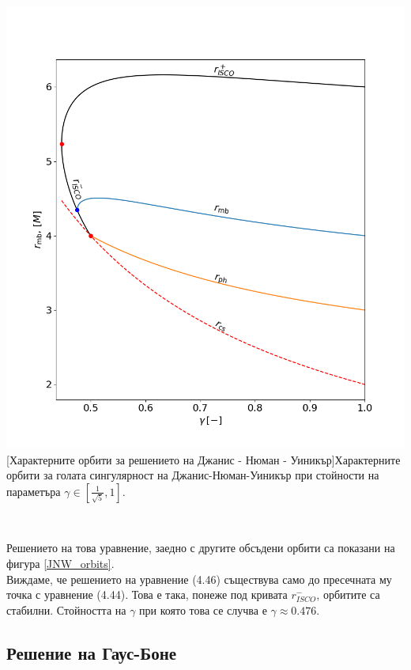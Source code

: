 \begin{minipage}{14em}
	\hspace{-0.8cm}
	\includegraphics[scale = 0.3]{JNW_orbits.png}
	[Характерните орбити за решението на Джанис - Нюман - Уиникър]{\small Характерните орбити за голата сингулярност на Джанис-Нюман-Уиникър при стойности на параметъра $\gamma \in [\frac{1}{\sqrt{5}}, 1]$.}
	\label{JNW_orbits}
\end{minipage}\,\,\,
\begin{minipage}{20em}
Решението на това уравнение, заедно с другите обсъдени орбити са показани на фигура \ref{JNW_orbits}.\\

Виждаме, че решението на уравнение (4.46) съществува само до пресечната му точка с уравнение (4.44). Това е така, понеже под кривата $r_{ISCO}^-$, орбитите са стабилни. Стойността на $\gamma$ при която това се случва е $\gamma\approx 0.476$.

\end{minipage}
\newpage
\subsection{Решение на Гаус-Боне}

